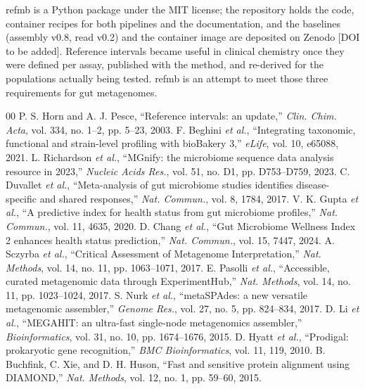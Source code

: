 \documentclass[conference]{IEEEtran}
\begin{document}
refmb is a Python package under the MIT license; the repository holds the code, container recipes for both pipelines and the documentation, and the baselines (assembly v0.8, read v0.2) and the container image are deposited on Zenodo [DOI to be added]. Reference intervals became useful in clinical chemistry once they were defined per assay, published with the method, and re-derived for the populations actually being tested. refmb is an attempt to meet those three requirements for gut metagenomes.

{\footnotesize
\begin{thebibliography}{00}
\setlength{\itemsep}{0.3pt}
 P. S. Horn and A. J. Pesce, ``Reference intervals: an update,'' \emph{Clin. Chim. Acta}, vol. 334, no. 1--2, pp. 5--23, 2003.
 F. Beghini \emph{et al.}, ``Integrating taxonomic, functional and strain-level profiling with bioBakery 3,'' \emph{eLife}, vol. 10, e65088, 2021.
 L. Richardson \emph{et al.}, ``MGnify: the microbiome sequence data analysis resource in 2023,'' \emph{Nucleic Acids Res.}, vol. 51, no. D1, pp. D753--D759, 2023.
 C. Duvallet \emph{et al.}, ``Meta-analysis of gut microbiome studies identifies disease-specific and shared responses,'' \emph{Nat. Commun.}, vol. 8, 1784, 2017.
 V. K. Gupta \emph{et al.}, ``A predictive index for health status from gut microbiome profiles,'' \emph{Nat. Commun.}, vol. 11, 4635, 2020.
 D. Chang \emph{et al.}, ``Gut Microbiome Wellness Index 2 enhances health status prediction,'' \emph{Nat. Commun.}, vol. 15, 7447, 2024.
 A. Sczyrba \emph{et al.}, ``Critical Assessment of Metagenome Interpretation,'' \emph{Nat. Methods}, vol. 14, no. 11, pp. 1063--1071, 2017.
 E. Pasolli \emph{et al.}, ``Accessible, curated metagenomic data through ExperimentHub,'' \emph{Nat. Methods}, vol. 14, no. 11, pp. 1023--1024, 2017.
 S. Nurk \emph{et al.}, ``metaSPAdes: a new versatile metagenomic assembler,'' \emph{Genome Res.}, vol. 27, no. 5, pp. 824--834, 2017.
 D. Li \emph{et al.}, ``MEGAHIT: an ultra-fast single-node metagenomics assembler,'' \emph{Bioinformatics}, vol. 31, no. 10, pp. 1674--1676, 2015.
 D. Hyatt \emph{et al.}, ``Prodigal: prokaryotic gene recognition,'' \emph{BMC Bioinformatics}, vol. 11, 119, 2010.
 B. Buchfink, C. Xie, and D. H. Huson, ``Fast and sensitive protein alignment using DIAMOND,'' \emph{Nat. Methods}, vol. 12, no. 1, pp. 59--60, 2015.

\end{thebibliography}}
\end{document}
